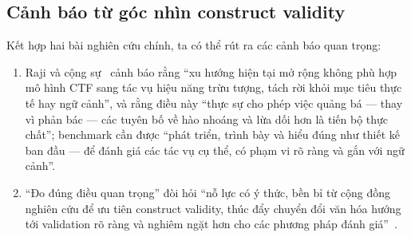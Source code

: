 \subsection{Cảnh báo từ góc nhìn construct validity}

Kết hợp hai bài nghiên cứu chính, ta có thể rút ra các cảnh báo quan trọng:

\begin{enumerate}
    \item Raji và cộng sự~\cite{everything_benchmark} cảnh báo rằng ``xu hướng hiện tại mở rộng không phù hợp mô hình CTF sang tác vụ hiệu năng trừu tượng, tách rời khỏi mục tiêu thực tế hay ngữ cảnh'', và rằng điều này ``thực sự cho phép việc quảng bá --- thay vì phản bác --- các tuyên bố về hào nhoáng và lừa dối hơn là tiến bộ thực chất''; benchmark cần được ``phát triển, trình bày và hiểu đúng như thiết kế ban đầu --- để đánh giá các tác vụ cụ thể, có phạm vi rõ ràng và gắn với ngữ cảnh''.
    
    \item ``Đo đúng điều quan trọng'' đòi hỏi ``nỗ lực có ý thức, bền bỉ từ cộng đồng nghiên cứu để ưu tiên construct validity, thúc đẩy chuyển đổi văn hóa hướng tới validation rõ ràng và nghiêm ngặt hơn cho các phương pháp đánh giá''~\cite{measuring_what_matters}.
\end{enumerate}